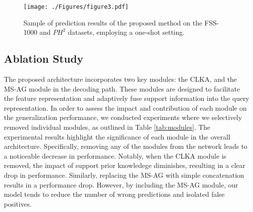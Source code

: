 \documentclass[runningheads]{llncs}
\begin{document}
\begin{figure}[!th]
    \centering
    \texttt{[image: ./Figures/figure3.pdf]}
    \caption{Sample of prediction results of the proposed method on the FSS-1000 and $PH^2$ datasets, employing a one-shot setting.}
    \label{fig:results}
\end{figure} 

\subsection{Ablation Study}
The proposed architecture incorporates two key modules: the CLKA, and the MS-AG module in the decoding path. These modules are designed to facilitate the feature representation and adaptively fuse support information into the query representation. In order to assess the impact and contribution of each module on the generalization performance, we conducted experiments where we selectively removed individual modules, as outlined in Table \ref{tab:modules}.
The experimental results highlight the significance of each module in the overall architecture. Specifically, removing any of the modules from the network leads to a noticeable decrease in performance. Notably, when the CLKA module is removed, the impact of support prior knowledege diminishes, resulting in a clear drop in performance. Similarly, replacing the MS-AG with simple concatenation results in a performance drop. However, by including the MS-AG module, our model tends to reduce the number of wrong predictions and isolated false positives.
\end{document}
